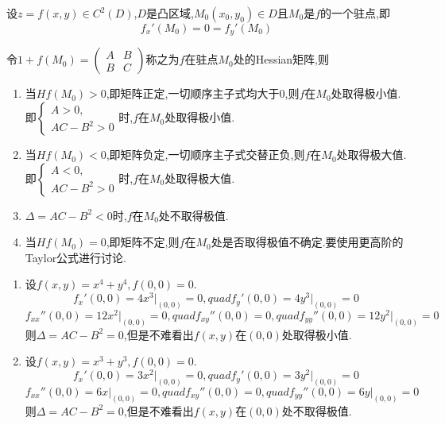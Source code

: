 \begin{theorem}
    设$z = f(x,y) \in C^2(D)$,$D$是凸区域,$M_0(x_0,y_0) \in D$且$M_0$是$f$的一个驻点,即
    $$f_x'(M_0) = 0 = f_y'(M_0)$$

    令$1+ f(M_0) = \begin{pmatrix}
        A & B\\
        B & C
    \end{pmatrix}$称之为$f$在驻点$M_0$处的Hessian矩阵,则
    \begin{enumerate}
        \item 当$Hf(M_0) > 0$,即矩阵正定,一切顺序主子式均大于0,则$f$在$M_0$处取得极小值.即$\begin{cases}
            A > 0,\\
            AC - B^2 > 0
        \end{cases}$时,$f$在$M_0$处取得极小值.
        \item 当$Hf(M_0) < 0$,即矩阵负定,一切顺序主子式交替正负,则$f$在$M_0$处取得极大值.即$\begin{cases}
            A < 0,\\
            AC - B^2 > 0
        \end{cases}$时,$f$在$M_0$处取得极大值.
        \item $\Delta = AC-B^2<0$时,$f$在$M_0$处不取得极值.
        \item 当$Hf(M_0) = 0$,即矩阵不定,则$f$在$M_0$处是否取得极值不确定.要使用更高阶的Taylor公式进行讨论.
    \end{enumerate}
\end{theorem}

\begin{example}
    \begin{enumerate}
    \item 设$f(x,y) = x^4+ y^4, f(0,0) = 0$.
    $$ f_x'(0,0) = 4x^3\bigg|_{(0,0)} = 0, quad f_y'(0,0) = 4y^3\bigg|_{(0,0)} = 0$$
    $$ f_{xx}''(0,0) = 12x^2\bigg|_{(0,0)} = 0, quad f_{xy}''(0,0) = 0, quad f_{yy}''(0,0) = 12y^2\bigg|_{(0,0)} = 0$$
    则$\Delta = AC - B^2 = 0$,但是不难看出$f(x,y)$在$(0,0)$处取得极小值.
    \item 设$f(x,y) = x^3 + y^3, f(0,0) = 0$.
    $$ f_x'(0,0) = 3x^2\bigg|_{(0,0)} = 0, quad f_y'(0,0) = 3y^2\bigg|_{(0,0)} = 0$$
    $$ f_{xx}''(0,0) = 6x\bigg|_{(0,0)} = 0, quad f_{xy}''(0,0) = 0, quad f_{yy}''(0,0) = 6y\bigg|_{(0,0)} = 0$$
    则$\Delta = AC - B^2 = 0$,但是不难看出$f(x,y)$在$(0,0)$处不取得极值.
    \end{enumerate}
\end{example}


